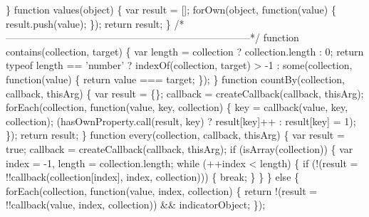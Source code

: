 \begin{DoxyCodeInclude}
{{\textcolor{stringliteral}{  \}}
\textcolor{stringliteral}{}
\textcolor{stringliteral}{  function values(object) \{}
\textcolor{stringliteral}{    var result = [];}
\textcolor{stringliteral}{    forOwn(object, function(value) \{}
\textcolor{stringliteral}{      result.push(value);}
\textcolor{stringliteral}{    \});}
\textcolor{stringliteral}{    return result;}
\textcolor{stringliteral}{  \}}
\textcolor{stringliteral}{}
\textcolor{stringliteral}{  /*--------------------------------------------------------------------------*/}
\textcolor{stringliteral}{}
\textcolor{stringliteral}{  function contains(collection, target) \{}
\textcolor{stringliteral}{    var length = collection ? collection.length : 0;}
\textcolor{stringliteral}{    return typeof length == 'number'}
\textcolor{stringliteral}{      ? indexOf(collection, target) > -1}
\textcolor{stringliteral}{      : some(collection, function(value) \{ return value === target; \});}
\textcolor{stringliteral}{  \}}
\textcolor{stringliteral}{}
\textcolor{stringliteral}{  function countBy(collection, callback, thisArg) \{}
\textcolor{stringliteral}{    var result = \{\};}
\textcolor{stringliteral}{    callback = createCallback(callback, thisArg);}
\textcolor{stringliteral}{    forEach(collection, function(value, key, collection) \{}
\textcolor{stringliteral}{      key = callback(value, key, collection);}
\textcolor{stringliteral}{      (hasOwnProperty.call(result, key) ? result[key]++ : result[key] = 1);}
\textcolor{stringliteral}{    \});}
\textcolor{stringliteral}{    return result;}
\textcolor{stringliteral}{  \}}
\textcolor{stringliteral}{}
\textcolor{stringliteral}{  function every(collection, callback, thisArg) \{}
\textcolor{stringliteral}{    var result = true;}
\textcolor{stringliteral}{    callback = createCallback(callback, thisArg);}
\textcolor{stringliteral}{}
\textcolor{stringliteral}{    if (isArray(collection)) \{}
\textcolor{stringliteral}{      var index = -1,}
\textcolor{stringliteral}{          length = collection.length;}
\textcolor{stringliteral}{}
\textcolor{stringliteral}{      while (++index < length) \{}
\textcolor{stringliteral}{        if (!(result = !!callback(collection[index], index, collection))) \{}
\textcolor{stringliteral}{          break;}
\textcolor{stringliteral}{        \}}
\textcolor{stringliteral}{      \}}
\textcolor{stringliteral}{    \} else \{}
\textcolor{stringliteral}{      forEach(collection, function(value, index, collection) \{}
\textcolor{stringliteral}{        return !(result = !!callback(value, index, collection)) && indicatorObject;}
\textcolor{stringliteral}{      \});}
}}
\end{DoxyCodeInclude}
